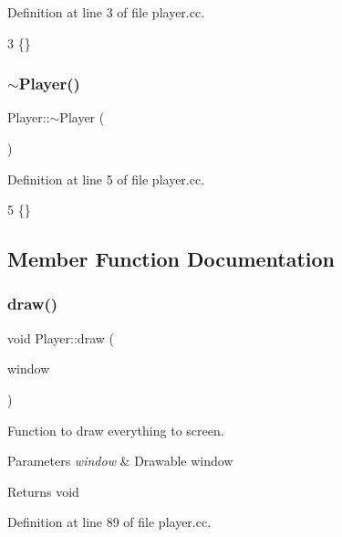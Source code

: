 Definition at line 3 of file player.\+cc.


\begin{DoxyCode}
3 \{\}
\end{DoxyCode}
\mbox{\label{class_player_a749d2c00e1fe0f5c2746f7505a58c062}} 
\subsubsection{\texorpdfstring{$\sim$\+Player()}{~Player()}}
{\footnotesize\ttfamily Player\+::$\sim$\+Player (\begin{DoxyParamCaption}{ }\end{DoxyParamCaption})}



Definition at line 5 of file player.\+cc.


\begin{DoxyCode}
5 \{\}
\end{DoxyCode}


\subsection{Member Function Documentation}
\mbox{\label{class_player_a70bbe0afb8ef88207288c9134ae80b6e}} 
\subsubsection{\texorpdfstring{draw()}{draw()}}
{\footnotesize\ttfamily void Player\+::draw (\begin{DoxyParamCaption}\item[{sf\+::\+Render\+Window \&}]{window }\end{DoxyParamCaption})}



Function to draw everything to screen. 


\begin{DoxyParams}{Parameters}
{\em window} & Drawable window \\
\hline
\end{DoxyParams}
\begin{DoxyReturn}{Returns}
void 
\end{DoxyReturn}


Definition at line 89 of file player.\+cc.



